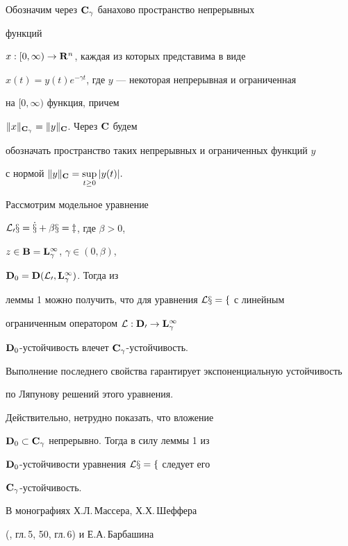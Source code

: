 Обозначим через $\bold C_\gamma$ банахово пространство непрерывных


функций


$x:[0,\infty) \to \bold R^n$, каждая из которых представима в виде


$x(t)=y(t)e^{-\gamma t}$, где $y$ --- некоторая непрерывная и ограниченная


на $[0,\infty)$ функция, причем


$\|x\|_{\bold C_\gamma}=\|y\|_{\bold C}$. Через $\bold C$ будем


обозначать пространство таких непрерывных и ограниченных функций $y$


с нормой $\|y\|_{\bold C}=\sup\limits_{t\ge 0}|y(t)|.$








\begin{note} Рассмотрим модельное уравнение


$\cal L_0 x =\Dot x+\beta x=z$, где $\beta > 0$,


$z\in\bold B=\bold L^\infty_\gamma$, $\gamma\in (0,\beta)$,


$\bold D_0 = \bold D(\cal L_0,\bold L^\infty_\gamma)$. Тогда из


леммы 1 можно получить, что для уравнения $\cal L x = f$ с линейным


ограниченным оператором $\cal L:\bold D_0\to\bold L^\infty_\gamma$


$\bold D_0$-устойчивость влечет $\bold C_\gamma$-устойчивость.


Выполнение последнего свойства гарантирует экспоненциальную устойчивость


по Ляпунову решений этого уравнения.


\end{note}





Действительно, нетрудно показать, что вложение


$\bold D_0\subset\bold C_\gamma$ непрерывно. Тогда в силу леммы 1 из


$\bold D_0$-устойчивости уравнения $\cal L x = f$ следует его


$\bold C_\gamma$-устойчивость.





В монографиях Х.Л.\,Массера, Х.Х.\,Шеффера


(\cite{Mass}, гл.\,5, 50, гл.\,6) и Е.А.\,Барбашина


